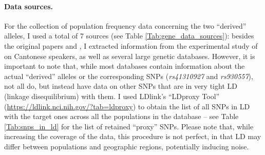 \documentclass[twoside,onecolumn]{article}
\begin{document}
\paragraph{Data sources.}
For the collection of population frequency data concerning the two ``derived'' alleles, I used a total of 7 sources (see Table \ref{Tab:gene_data_sources}): besides the original papers \citet{evans_microcephalin_2005} and \citet{mekelbobrov_aspm_2005}, I extracted information from the experimental study of \citet{wong_sciadv_2020} on Cantonese speakers, as well as several large genetic databases.
However, it is important to note that, while most databases contain information about the actual ``derived'' alleles or the corresponding SNPs (\textit{rs41310927} and \textit{rs930557}), not all do, but instead have data on other SNPs that are in very tight LD (linkage disequilibrium) with them.
I used LDlink’s ``LDproxy Tool'' (\url{https://ldlink.nci.nih.gov/?tab=ldproxy}) to obtain the list of all SNPs in LD with the target ones across all the populations in the database -- see Table \ref{Tab:snps_in_ld} for the list of retained ``proxy'' SNPs.
Please note that, while increasing the coverage of the data, this procedure is not perfect, in that LD may differ between populations and geographic regions, potentially inducing noise.
\end{document}
